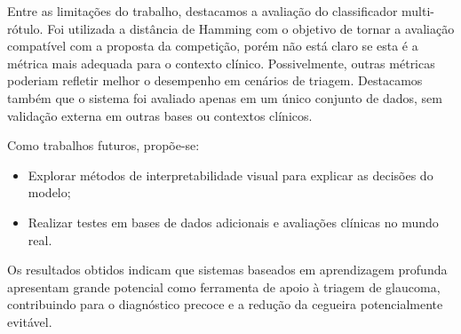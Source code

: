 \documentclass[12pt]{article}
\begin{document}

Entre as limitações do trabalho, destacamos a avaliação do classificador multi-rótulo. Foi utilizada a distância de Hamming com o objetivo de tornar a avaliação compatível com a proposta da competição, porém não está claro se esta é a métrica mais adequada para o contexto clínico. Possivelmente, outras métricas poderiam refletir melhor o desempenho em cenários de triagem. Destacamos também que o sistema foi avaliado apenas em um único conjunto de dados, sem validação externa em outras bases ou contextos clínicos.




Como trabalhos futuros, propõe-se:
\begin{itemize}[noitemsep]
    \item Explorar métodos de interpretabilidade visual para explicar as decisões do modelo;
    \item Realizar testes em bases de dados adicionais e avaliações clínicas no mundo real.
\end{itemize}

Os resultados obtidos indicam que sistemas baseados em aprendizagem profunda apresentam grande potencial como ferramenta de apoio à triagem de glaucoma, contribuindo para o diagnóstico precoce e a redução da cegueira potencialmente evitável.

\end{document}
